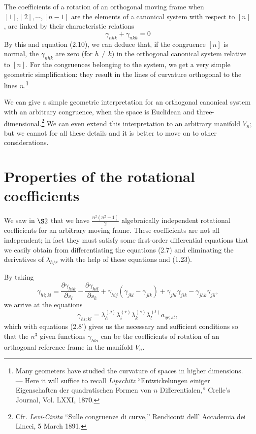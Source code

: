 \documentclass{book}
\begin{document}
The coefficients of a rotation of an orthogonal moving frame when\\ $[1],[2],\cdots,[n-1]$ are the elements of a canonical system with respect to $[n]$, are linked by their characteristic relations
\begin{equation}
\gamma_{nhk}+\gamma_{nkh}=0
\end{equation}
By this and equation (2.10), we can deduce that, if the congruence $[n]$ is normal, the $\gamma_{nhk}$ are zero (for $h\neq k$) in the orthogonal canonical system relative to $[n]$. For the congruences belonging to the system, we get a very simple geometric simplification: they result in the lines of curvature orthogonal to the lines $n$.\footnote{Many geometers have studied the curvature of spaces in higher dimensions. --- Here it will suffice to recall \emph{Lipschitz} ``Entwickelungen einiger Eigenschaften der quadratischen Formen von $n$ Differentialen,'' Crelle's Journal, Vol. LXXI, 1870.}

We can give a simple geometric interpretation for an orthogonal canonical system with an arbitrary congruence, when the space is Euclidean and three-dimensional.\footnote{Cfr. \emph{Levi-Civita} ``Sulle congruenze di curve,'' Rendiconti dell' Accademia dei Lincei, 5 March 1891.} We can even extend this interpretation to an arbitrary manifold $V_n$; but we cannot for all these details and it is better to move on to other considerations.

\section{Properties of the rotational coefficients}

We saw in $\S2$ that we have $\frac{n^2(n^2-1)}{2}$ algebraically independent rotational coefficients for an arbitrary moving frame. These coefficients are not all independent; in fact they must satisfy some first-order differential equations that we easily obtain from differentiating the equations (2.7) and eliminating the derivatives of $\lambda_{h/r}$ with the help of these equations and (1.23). 

By taking
\begin{equation}
\gamma_{hi;kl}=\frac{\partial \gamma_{hik}}{\partial s_l}-\frac{\partial \gamma_{hil}}{\partial s_k}+{\gamma_{hij}(\gamma_{jkl}-\gamma_{jlk})+\gamma_{jhl}\gamma_{jik}-\gamma_{jhk}\gamma_{jil}},
\end{equation}
we arrive at the equations
\begin{equation}
\gamma_{hi;kl}=\lambda_h^{(g)}\lambda_i^{(r)}\lambda_k^{(s)}\lambda_l^{(t)}a_{qr;st},
\end{equation}
which with equations (2.8') gives us the necessary and sufficient conditions so that the $n^3$ given functions $\gamma_{hki}$ can be the coefficients of rotation of an orthogonal reference frame in the manifold $V_n$. 
\end{document}
